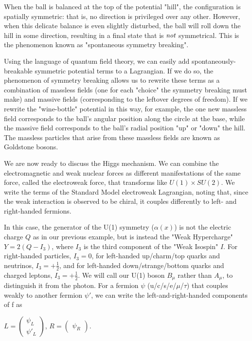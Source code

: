 When the ball is balanced at the top of the potential "hill", the configuration is spatially symmetric: that is, no direction is privileged over any other. However, when this delicate balance is even slightly disturbed, the ball will roll down the hill in some direction, resulting in a final state that is $\emph{not}$ symmetrical. This is the phenomenon known as "spontaneous symmetry breaking".

Using the language of quantum field theory, we can easily add spontaneously-breakable symmetric potential terms to a Lagrangian. If we do so, the phenomenon of symmetry breaking allows us to rewrite these terms as a combination of massless fields (one for each "choice" the symmetry breaking must make) and massive fields (corresponding to the leftover degrees of freedom). If we rewrite the "wine-bottle" potential in this way, for example, the one new massless field corresponds to the ball's angular position along the circle at the base, while the massive field corresponds to the ball's  radial position "up" or "down" the hill. The massless particles that arise from these massless fields are known as Goldstone bosons.

We are now ready to discuss the Higgs mechanism. We can combine the electromagnetic and weak nuclear forces as different manifestations of the same force, called the electroweak force, that transforms like $U(1) \times SU(2)$. We write the terms of the Standard Model electroweak Lagrangian, noting that, since the weak interaction is observed to be chiral, it couples differently to left- and right-handed fermions.

In this case, the generator of the U(1) symmetry ($\alpha(x)$) is not the electric charge $Q$ as in our previous example, but is instead the "Weak Hypercharge" $Y = 2(Q -I_{3})$, where $I_{3}$ is the third component of the "Weak Isospin" $I$. For right-handed particles, $I_{3} = 0$, for left-handed up/charm/top quarks and neutrinos, $I_{3} = +\frac{1}{2}$, and for left-handed down/strange/bottom quarks and charged leptons, $I_{3} = +\frac{1}{2}$. We will call our U(1) boson $B_{\mu}$ rather than $A_{\mu}$, to distinguish it from the photon. For a fermion $\psi$ (u/c/s/e/$\mu$/$\tau$) that couples weakly to another fermion $\psi'$, we can write the left-and-right-handed components of f as 

$L = \begin{pmatrix} \psi_{L} \\ \psi'_{L} \end{pmatrix}$, $R = \begin{pmatrix}\psi_{R} \end{pmatrix}$.

